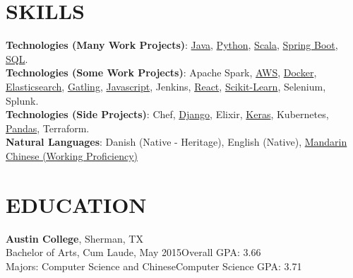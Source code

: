 \documentclass[margin]{res}
\begin{document}
\begin{resume}

\section{SKILLS}

\textbf{Technologies (Many Work Projects)}:
\href{https://www.lucaskjaerozhang.com/technology/java/}{Java},
\href{https://www.lucaskjaerozhang.com/technology/python/}{Python},
\href{https://www.lucaskjaerozhang.com/technology/scala/}{Scala},
\href{https://www.lucaskjaerozhang.com/technology/spring-boot/}{Spring Boot},
\href{https://www.lucaskjaerozhang.com/technology/sql/}{SQL}.
\\
\textbf{Technologies (Some Work Projects)}:
Apache Spark,
\href{https://www.lucaskjaerozhang.com/technology/aws/}{AWS},
\href{https://www.lucaskjaerozhang.com/technology/docker/}{Docker},
\href{https://www.lucaskjaerozhang.com/technology/elasticsearch/}{Elasticsearch},
\href{https://www.lucaskjaerozhang.com/technology/gatling/}{Gatling},
\href{https://www.lucaskjaerozhang.com/technology/javascript/}{Javascript},
Jenkins,
\href{https://www.lucaskjaerozhang.com/technology/react/}{React},
\href{https://www.lucaskjaerozhang.com/technology/sklearn/}{Scikit-Learn},
Selenium,
Splunk.
\\
\textbf{Technologies (Side Projects)}:
Chef,
\href{https://www.lucaskjaerozhang.com/technology/django/}{Django},
Elixir,
\href{https://www.lucaskjaerozhang.com/technology/keras/}{Keras},
Kubernetes,
\href{https://www.lucaskjaerozhang.com/technology/pandas/}{Pandas},
Terraform.
\\
\textbf{Natural Languages}: Danish (Native - Heritage), English (Native), \href{https://www.lucaskjaerozhang.com/lucas-kjaero-zhang-%E4%B8%AA%E4%BA%BA%E7%AE%80%E5%8E%86.pdf}{Mandarin Chinese (Working Proficiency)}


\section{EDUCATION}
\textbf{Austin College}, Sherman, TX\\
Bachelor of Arts, Cum Laude, May 2015\hfill Overall GPA:
3.66\\
Majors: Computer Science and Chinese\hfill Computer Science GPA: 3.71\\


\end{resume}
\end{document}
